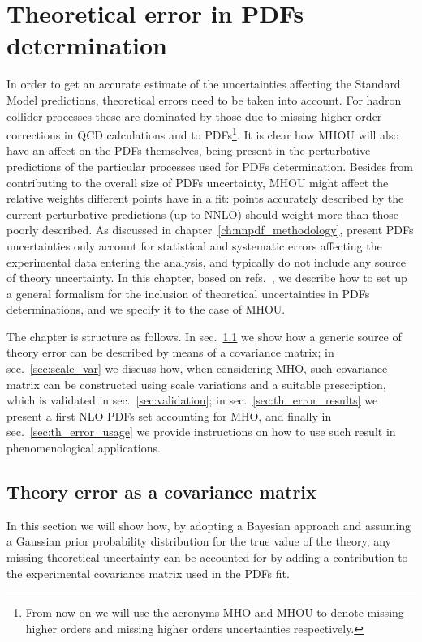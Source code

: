 \chapter{Theoretical error in PDFs determination}
\label{ch:th_error}
In order to get an accurate estimate of the uncertainties affecting the Standard Model predictions, theoretical 
errors need to be taken into account. 
For hadron collider processes these are dominated by those due to missing higher order corrections in QCD calculations 
and to PDFs\footnote{From now on we will use the acronyms MHO and MHOU to denote missing higher orders
 and missing higher orders uncertainties respectively.}. 
It is clear how MHOU will also have an affect on the PDFs themselves, being present in the perturbative predictions
of the particular processes used for PDFs determination. Besides from contributing to the overall
size of PDFs uncertainty, MHOU might affect the relative weights different points have in a fit:
points accurately described by the current perturbative predictions (up to NNLO) should weight more
than those poorly described. 
%
As discussed in chapter~\ref{ch:nnpdf_methodology}, present PDFs uncertainties only account for statistical and 
systematic errors affecting the experimental data entering the analysis, and typically do not include any source 
of theory uncertainty.
%
In this chapter, based on refs.~\cite{AbdulKhalek:2019bux,AbdulKhalek:2019ihb}, we describe how to set up 
a general formalism for the inclusion of theoretical uncertainties in PDFs determinations,
and we specify it to the case of MHOU.

% 
The chapter is structure as follows. In sec.~\ref{sec:th_err_as_cov} we show how a generic source of theory error 
can be described by means of a covariance matrix; in sec.~\ref{sec:scale_var} we discuss how, when considering
MHO, such covariance matrix can be constructed using scale variations and a suitable prescription,
which is validated in sec.~\ref{sec:validation};
in sec.~\ref{sec:th_error_results} we present a first NLO PDFs set accounting for MHO, and finally in sec.~\ref{sec:th_error_usage}
we provide instructions on how to use such result in phenomenological applications.


 \section{Theory error as a covariance matrix}
 \label{sec:th_err_as_cov}
 In this section we will show how, by adopting a Bayesian approach and
 assuming a Gaussian prior probability distribution for the true value of the theory, any missing theoretical
 uncertainty can be accounted for by adding a contribution to the experimental covariance matrix used in the PDFs fit.

